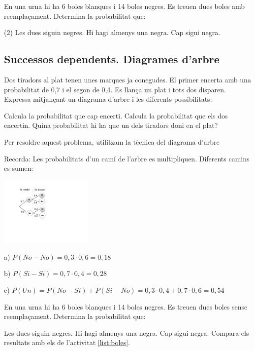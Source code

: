 \begin{mylist}
 \exer[1] \label{list:boles} En una urna hi ha 6 boles blanques i 14 boles negres. Es treuen dues boles amb reemplaçament. Determina la probabilitat que: 
\begin{tasks}(2)
	\task  Les dues siguin negres.  
	\task  Hi hagi almenys una negra.  
	\task  Cap sigui negra.
\end{tasks}

\subsection{Successos dependents. Diagrames d'arbre}

\begin{resolt}[E]{
	 Dos tiradors al plat tenen unes marques ja conegudes. El primer encerta amb una probabilitat de 0,7 i el segon de 0,4. Es llança un plat i tots dos disparen. Expressa mitjançant un diagrama d'arbre i les diferents possibilitats: 
	 \vspace{0.5cm}
	 
	 \begin{tasks}
	 	\task  Calcula la probabilitat que cap encerti.
	 	\task  Calcula la probabilitat que els dos encertin.
	 	\task  Quina probabilitat hi ha que un dels tiradors doni en el plat?
	 \end{tasks}
}
	Per resoldre aquest problema, utilitzam la tècnica del diagrama d'arbre 
	
	Recorda: Les probabilitats d'un camí de l'arbre es multipliquen. Diferents camins es sumen:
	
	\begin{center}
	\includegraphics[width=4.5cm]{img-04/arbre}
	\end{center}
	
	a) $P(No-No)=0,3 \cdot 0,6 = 0,18$
	
	b) $P(Si-Si)=0,7 \cdot 0,4 = 0,28$
	
	c) $P(Un)= P(No-Si)+P(Si-No) = 0,3 \cdot 0,4 + 0,7\cdot 0,6 = 0,54$
	
\end{resolt}
 
\exer[1]  En una urna hi ha 6 boles blanques i 14 boles negres. Es treuen dues boles sense reemplaçament. Determina la probabilitat que: 
\begin{tasks}
	\task  Les dues siguin negres. 
	\task  Hi hagi almenys una negra.
	\task  Cap sigui negra.
	\task  Compara els resultats amb els de l'activitat \ref{list:boles}.
\end{tasks}


\end{mylist}
